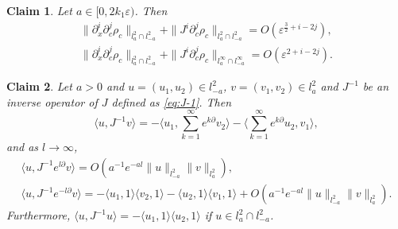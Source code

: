 \documentclass[11pt]{amsart}
\newtheorem{claim}{Claim}[section]
\theoremstyle{remark}
\numberwithin{equation}{section}
\begin{document}
\begin{claim}
Let $a\in[0,2k_1{\varepsilon})$. Then
  \label{cl:rhoc}
\begin{gather*}
\|{\partial}_x^i{\partial}_c^j\rho_c\|_{l^2_a\cap l^2_{-a}}
+\|J^i{\partial}_c^j\rho_c\|_{l^2_a\cap l^2_{-a}}
=O({\varepsilon}^{\frac32+i-2j}),\\
\|{\partial}_x^i{\partial}_c^j\rho_c\|_{l^2_a\cap l^2_{-a}}
+\|J^i{\partial}_c^j\rho_c\|_{l^\infty_a\cap l^\infty_{-a}}
=O({\varepsilon}^{2+i-2j}).
\end{gather*}
\end{claim}
\begin{claim}
  \label{cl:j-1}
Let $a>0$ and $u=(u_1,u_2)\in l^2_{-a}$, $v=(v_1,v_2)\in l^2_a$ and 
$J^{-1}$ be an inverse operator of $J$ defined as \eqref{eq:J-1}.
Then 
$$ {\langle} u, J^{-1}v{\rangle}=
-{\langle} u_1, \sum_{k=1}^\infty e^{k{\partial}}v_2{\rangle}
-{\langle} \sum_{k=1}^\infty e^{k{\partial}}u_2, v_1{\rangle},$$
and as $l\to\infty$,
\begin{gather*}
{\langle} u,J^{-1}e^{l{\partial}}v{\rangle}
=O(a^{-1}e^{-al}\|u\|_{l^2_{-a}}\|v\|_{l^2_a}),
\\ {\langle} u,J^{-1}e^{-l{\partial}}v{\rangle}=-{\langle} u_1,1{\rangle}{\langle} v_2,1{\rangle}
-{\langle} u_2,1{\rangle}{\langle} v_1,1{\rangle}+O(a^{-1}e^{-al}\|u\|_{l^2_{-a}}\|v\|_{l^2_a}).
\end{gather*}
Furthermore,  ${\langle} u,J^{-1}u{\rangle}=-{\langle} u_1,1{\rangle}{\langle} u_2,1{\rangle}$
if $u\in l^2_a\cap l^2_{-a}$.
\end{claim}
\end{document}
